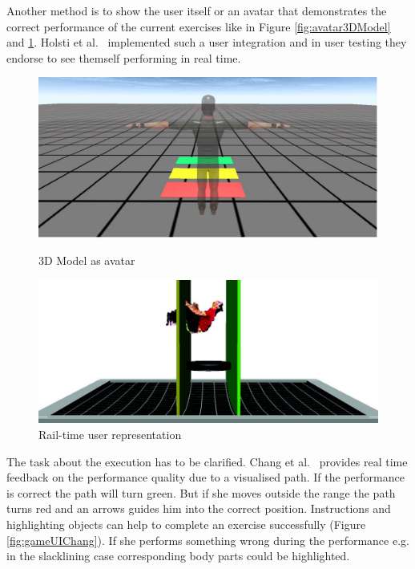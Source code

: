 Another method is to show the user itself or an avatar that demonstrates the correct performance of the current exercises like in Figure \ref{fig:avatar3DModel} and \ref{fig:avatarUser}. Holsti et al.~\cite{Holsti2013-kn} implemented such a user integration and in user testing they endorse to see themself performing in real time.

\begin{figure}[htb]
	\centering
	\begin{minipage}[t]{0.49\linewidth}
		\centering
		\includegraphics[width=1\linewidth]{Pictures/avatar3DModel}
		\caption{3D Model as avatar~\cite{Estepa2016-oj}}
		\label{fig:avatar3DModel}
	\end{minipage}
	\hfill
	\begin{minipage}[t]{0.49\linewidth}
		\centering
		\includegraphics[width=1\linewidth]{Pictures/avatarUser}
		\caption{Rail-time user representation~\cite{Holsti2013-kn}}
		\label{fig:avatarUser}
	\end{minipage}
\end{figure}

The task about the execution has to be clarified. Chang et al.~\cite{Chang2012-hz} provides real time feedback on the performance quality due to a visualised path. If the performance is correct the path will turn green. But if she moves outside the range the path turns red and an arrows guides him into the correct position. Instructions and highlighting objects can help to complete an exercise successfully (Figure \ref{fig:gameUIChang}). If she performs something wrong during the performance e.g. in the slacklining case corresponding body parts could be highlighted.

